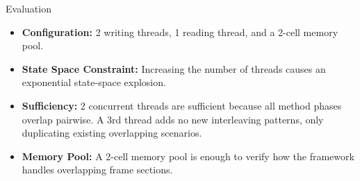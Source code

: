 \begin{frame}{Evaluation}

\begin{itemize}
    \item \textbf{Configuration:} 2 writing threads, 1 reading thread, and a 2-cell memory pool.

    \item \textbf{State Space Constraint:} Increasing the number of threads causes an exponential state-space explosion.


    \pause

    \item \textbf{Sufficiency:} 2 concurrent threads are sufficient because all method phases overlap pairwise. A 3rd thread adds no new interleaving patterns, only duplicating existing overlapping scenarios.

    \item \textbf{Memory Pool:} A 2-cell memory pool is enough to verify how the framework handles overlapping frame sections.

\end{itemize}

\end{frame}
